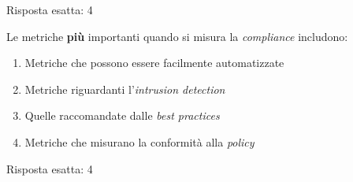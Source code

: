 \begin{Answer} [
  ref={esSM5},
  number={5}
  ]

  \Question Risposta esatta: 4
\end{Answer}


\begin{Exercise} [
  title={Quiz},
  label={esSM6}
  ]

  \Question Le metriche \textbf{più} importanti quando si misura la 
\textit{compliance} includono:
\begin{enumerate}
 \item Metriche che possono essere facilmente automatizzate
 \item Metriche riguardanti l'\textit{intrusion detection}
 \item Quelle raccomandate dalle \textit{best practices}
 \item Metriche che misurano la conformità alla \textit{policy}
\end{enumerate}
  
\end{Exercise}

\begin{Answer} [
  ref={esSM6},
  number={6}
  ]

  \Question Risposta esatta: 4
\end{Answer}

